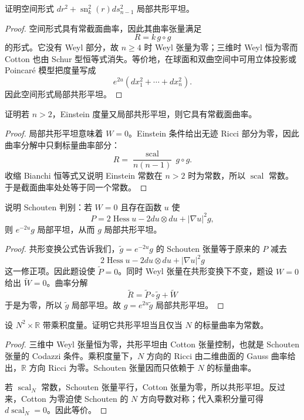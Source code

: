 \documentclass[11pt,a4paper,openany]{ctexbook}
\numberwithin{equation}{chapter}
\begin{document}
\begin{problem}
证明空间形式 \(dr^2+\operatorname{sn}_k^2(r)ds_{n-1}^2\) 局部共形平坦。
\end{problem}
\begin{proof}
空间形式具有常截面曲率，因此其曲率张量满足
\[
R=k\,g\circ g
\]
的形式。它没有 Weyl 部分，故 \(n\ge4\) 时 Weyl 张量为零；三维时 Weyl 恒为零而 Cotton 也由 Schur 型恒等式消失。等价地，在球面和双曲空间中可用立体投影或 Poincaré 模型把度量写成
\[
e^{2u}(dx_1^2+\cdots+dx_n^2).
\]
因此空间形式局部共形平坦。
\end{proof}

\begin{problem}
证明若 \(n>2\)，Einstein 度量又局部共形平坦，则它具有常截面曲率。
\end{problem}
\begin{proof}
局部共形平坦意味着 \(W=0\)。Einstein 条件给出无迹 Ricci 部分为零，因此曲率分解中只剩标量曲率部分：
\[
R=\frac{\operatorname{scal}}{n(n-1)}\,g\circ g.
\]
收缩 Bianchi 恒等式又说明 Einstein 常数在 \(n>2\) 时为常数，所以 \(\operatorname{scal}\) 常数。于是截面曲率处处等于同一个常数。
\end{proof}

\begin{problem}
说明 Schouten 判别：若 \(W=0\) 且存在函数 \(u\) 使
\[
P=2\operatorname{Hess}u-2du\otimes du+|\nabla u|^2g,
\]
则 \(e^{-2u}g\) 局部平坦，从而 \(g\) 局部共形平坦。
\end{problem}
\begin{proof}
共形变换公式告诉我们，\(\tilde g=e^{-2u}g\) 的 Schouten 张量等于原来的 \(P\) 减去
\[
2\operatorname{Hess}u-2du\otimes du+|\nabla u|^2g
\]
这一修正项。因此题设使 \(\tilde P=0\)。同时 Weyl 张量在共形变换下不变，题设 \(W=0\) 给出 \(\tilde W=0\)。曲率分解
\[
\tilde R=\tilde P\circ\tilde g+\tilde W
\]
于是为零，所以 \(\tilde g\) 局部平坦。故 \(g=e^{2u}\tilde g\) 局部共形平坦。
\end{proof}

\begin{problem}
设 \(N^2\times\mathbb R\) 带乘积度量。证明它共形平坦当且仅当 \(N\) 的标量曲率为常数。
\end{problem}
\begin{proof}
三维中 Weyl 张量恒为零，共形平坦由 Cotton 张量控制，也就是 Schouten 张量的 Codazzi 条件。乘积度量下，\(N\) 方向的 Ricci 由二维曲面的 Gauss 曲率给出，\(\mathbb R\) 方向 Ricci 为零。Schouten 张量因而只依赖于 \(N\) 的标量曲率。

若 \(\operatorname{scal}_N\) 常数，Schouten 张量平行，Cotton 张量为零，所以共形平坦。反过来，Cotton 为零迫使 Schouten 的 \(N\) 方向导数对称；代入乘积分量可得 \(d\operatorname{scal}_N=0\)。因此等价。
\end{proof}
\end{document}
